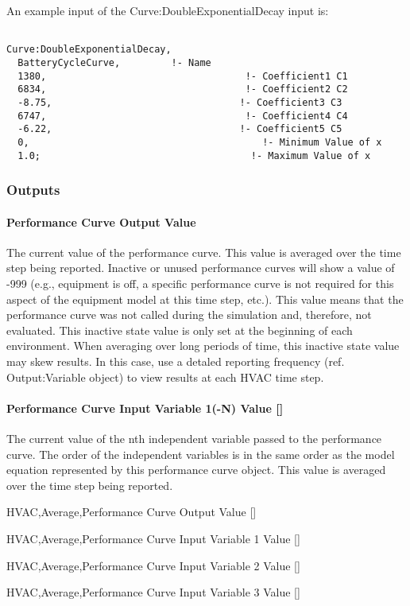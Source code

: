 An example input of the Curve:DoubleExponentialDecay input is:

\begin{lstlisting}

Curve:DoubleExponentialDecay,
  BatteryCycleCurve,         !- Name
  1380,                                   !- Coefficient1 C1
  6834,                                   !- Coefficient2 C2
  -8.75,                                 !- Coefficient3 C3
  6747,                                   !- Coefficient4 C4
  -6.22,                                 !- Coefficient5 C5
  0,                                         !- Minimum Value of x
  1.0;                                     !- Maximum Value of x
\end{lstlisting}

\subsubsection{Outputs}\label{outputs-021}

\paragraph{Performance Curve Output Value}\label{performance-curve-output-value}

The current value of the performance curve. This value is averaged over the time step being reported. Inactive or unused performance curves will show a value of -999 (e.g., equipment is off, a specific performance curve is not required for this aspect of the equipment model at this time step, etc.). This value means that the performance curve was not called during the simulation and, therefore, not evaluated. This inactive state value is only set at the beginning of each environment. When averaging over long periods of time, this inactive state value may skew results. In this case, use a detaled reporting frequency (ref. Output:Variable object) to view results at each HVAC time step.

\paragraph{\texorpdfstring{Performance Curve Input Variable 1(-N) Value {[]}}{Performance Curve Input Variable 1(-N) Value }}\label{performance-curve-input-variable-1-n-value}

The current value of the nth independent variable passed to the performance curve. The order of the independent variables is in the same order as the model equation represented by this performance curve object. This value is averaged over the time step being reported.

HVAC,Average,Performance Curve Output Value {[]}

HVAC,Average,Performance Curve Input Variable 1 Value {[]}

HVAC,Average,Performance Curve Input Variable 2 Value {[]}

HVAC,Average,Performance Curve Input Variable 3 Value {[]}
